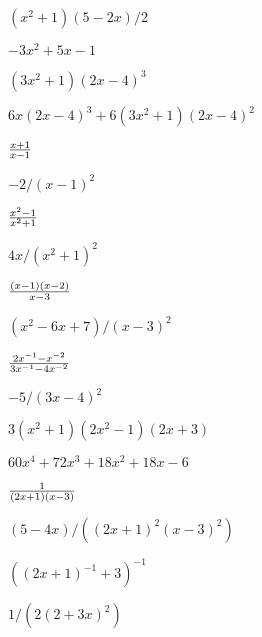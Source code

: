 \begin{exercises}
\begin{exercise} $(x^2+1)(5-2x)/2$
\begin{answer} $-3x^2+5x-1$
\end{answer}\end{exercise}

\begin{exercise} $(3x^2+1)(2x-4)^3$
\begin{answer} $6x(2x-4)^3+6(3x^2+1)(2x-4)^2$
\end{answer}\end{exercise}

\begin{exercise} ${x+1\over x-1}$
\begin{answer} $-2/(x-1)^2$
\end{answer}\end{exercise}

\begin{exercise} ${x^2-1\over x^2+1}$
\begin{answer} $4x/(x^2+1)^2$
\end{answer}\end{exercise}

\begin{exercise} ${(x-1)(x-2)\over x-3}$
\begin{answer} $(x^2-6x+7)/(x-3)^2$
\end{answer}\end{exercise}

\begin{exercise} ${2x^{-1}-x^{-2}\over 3x^{-1}-4x^{-2}}$
\begin{answer} $-5/(3x-4)^2$
\end{answer}\end{exercise}

\begin{exercise} $3(x^2+1)(2x^2-1)(2x+3)$
\begin{answer} $60x^4+72x^3+18x^2+18x-6$
\end{answer}\end{exercise}

\begin{exercise} ${1\over (2x+1)(x-3)}$
\begin{answer} $(5-4x)/((2x+1)^2(x-3)^2)$
\end{answer}\end{exercise}

\begin{exercise} $((2x+1)^{-1}+3)^{-1}$
\begin{answer} $1/(2(2+3x)^2)$
\end{answer}\end{exercise}


\end{exercises}
